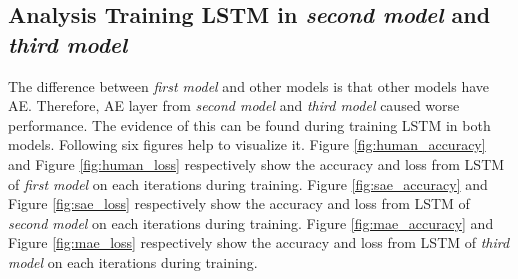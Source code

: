 \documentclass[draft,dvipsnames]{drexel-thesis}
\begin{document}
\begin{thesis}
%


\subsection{Analysis Training LSTM in {\em second model} and {\em third model}}
The difference between {\em first model} and other models is that other models have AE. Therefore, AE layer from {\em second model} and {\em third model} caused worse performance. The evidence of this can be found during training LSTM in both models. Following six figures help to visualize it. Figure \ref{fig:human_accuracy} and Figure \ref{fig:human_loss} respectively show the accuracy and loss from LSTM of {\em first model} on each iterations during training. Figure \ref{fig:sae_accuracy} and Figure \ref{fig:sae_loss} respectively show the accuracy and loss from LSTM of {\em second model} on each iterations during training. Figure \ref{fig:mae_accuracy} and Figure \ref{fig:mae_loss} respectively show the accuracy and loss from LSTM of {\em third model} on each iterations during training.


\end{thesis}
\end{document}
